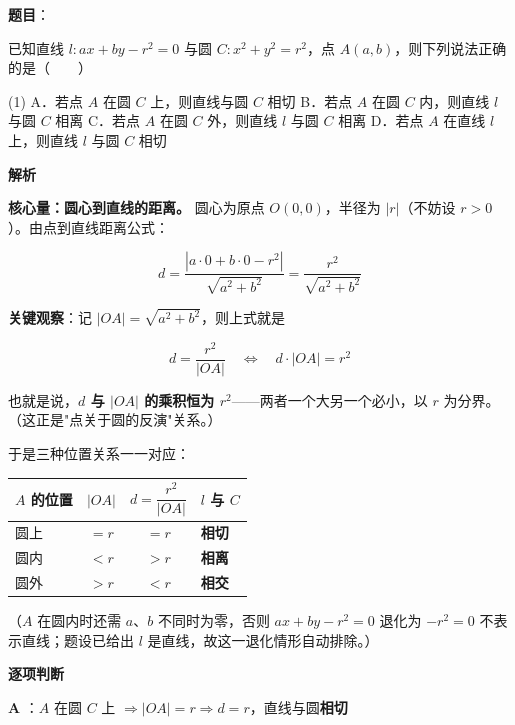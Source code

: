 \begin{answer}

\textbf{题目}：

已知直线 $l:ax+by-r^{2}=0$ 与圆 $C:x^{2}+y^{2}=r^{2}$，点 $A(a,b)$，则下列说法正确的是\mbox{（　　）}

\begin{gkopts}(1)
\task A．若点 $A$ 在圆 $C$ 上，则直线与圆 $C$ 相切
\task B．若点 $A$ 在圆 $C$ 内，则直线 $l$ 与圆 $C$ 相离
\task C．若点 $A$ 在圆 $C$ 外，则直线 $l$ 与圆 $C$ 相离
\task D．若点 $A$ 在直线 $l$ 上，则直线 $l$ 与圆 $C$ 相切
\end{gkopts}

\textbf{解析}

\textbf{核心量：圆心到直线的距离。} 圆心为原点 $O(0,0)$，半径为 $|r|$（不妨设 $r>0$）。由点到直线距离公式：

\nopagebreak[4]
\[d=\frac{\left|a\cdot0+b\cdot0-r^{2}\right|}{\sqrt{a^{2}+b^{2}}}=\frac{r^{2}}{\sqrt{a^{2}+b^{2}}}\]

\textbf{关键观察}：记 $|OA|=\sqrt{a^{2}+b^{2}}$，则上式就是

\nopagebreak[4]
\[\boxed{\ d=\frac{r^{2}}{|OA|}\quad\Longleftrightarrow\quad d\cdot|OA|=r^{2}\ }\]

也就是说，\textbf{$d$ 与 $|OA|$ 的乘积恒为 $r^{2}$}——两者一个大另一个必小，以 $r$ 为分界。（这正是"点关于圆的反演"关系。）

于是三种位置关系一一对应：

\begin{center}
\begin{tabular}{lccl}
\toprule
$A$ 的位置 & $\lvert OA\rvert$ & $d=\dfrac{r^{2}}{\lvert OA\rvert}$ & $l$ 与 $C$ \\
\midrule
圆上 & $=r$ & $=r$ & \textbf{相切} \\
圆内 & $<r$ & $>r$ & \textbf{相离} \\
圆外 & $>r$ & $<r$ & \textbf{相交} \\
\bottomrule
\end{tabular}
\end{center}

（$A$ 在圆内时还需 $a$、$b$ 不同时为零，否则 $ax+by-r^{2}=0$ 退化为 $-r^{2}=0$ 不表示直线；题设已给出 $l$ 是直线，故这一退化情形自动排除。）

\par\medskip

\textbf{逐项判断}

\textbf{A }：$A$ 在圆 $C$ 上 $\Rightarrow|OA|=r\Rightarrow d=r$，直线与圆\textbf{相切} 


\end{answer}
